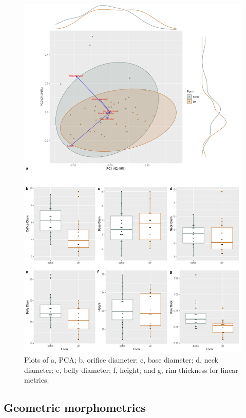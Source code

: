\documentclass[]{interact}
\theoremstyle{plain}%
\theoremstyle{definition}
\theoremstyle{remark}
\begin{document}
\begin{figure}\centering
\includegraphics[width=\linewidth]{figs/linear.fig.png}
\caption{Plots of a, PCA; b, orifice diameter; c, base diameter; d, neck diameter; e, belly diameter; f, height; and g, rim thickness for linear metrics.}
\label{fig:linear}
\end{figure}

\hypertarget{geometric-morphometrics}{%
\subsection{Geometric morphometrics}\label{geometric-morphometrics}}
\end{document}
